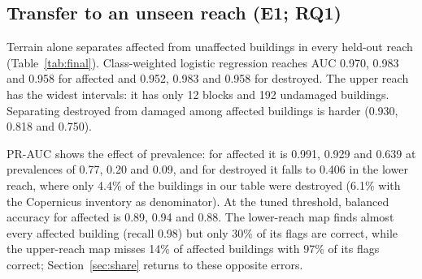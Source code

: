 \documentclass[journal,a4paper]{IEEEtran}
\begin{document}
\subsection{Transfer to an unseen reach (E1; RQ1)}
Terrain alone separates affected from unaffected buildings in every held-out reach (Table~\ref{tab:final}). Class-weighted logistic regression reaches AUC 0.970, 0.983 and 0.958 for affected and 0.952, 0.983 and 0.958 for destroyed. The upper reach has the widest intervals: it has only 12 blocks and 192 undamaged buildings. Separating destroyed from damaged among affected buildings is harder (0.930, 0.818 and 0.750).

PR-AUC shows the effect of prevalence: for affected it is 0.991, 0.929 and 0.639 at prevalences of 0.77, 0.20 and 0.09, and for destroyed it falls to 0.406 in the lower reach, where only 4.4\% of the buildings in our table were destroyed (6.1\% with the Copernicus inventory as denominator). At the tuned threshold, balanced accuracy for affected is 0.89, 0.94 and 0.88. The lower-reach map finds almost every affected building (recall 0.98) but only 30\% of its flags are correct, while the upper-reach map misses 14\% of affected buildings with 97\% of its flags correct; Section~\ref{sec:share} returns to these opposite errors.
\end{document}
